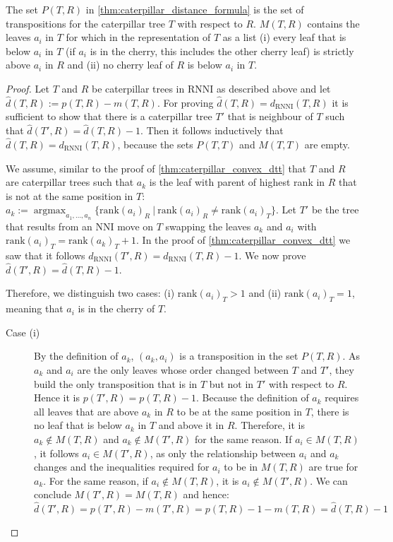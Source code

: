 \documentclass[11pt]{amsart}
\newcommand{\rnni}{\mathrm{RNNI}}
\newcommand{\rank}{\mathrm{rank}}
\newcommand{\nni}{\mathrm{NNI}}
\DeclareMathOperator*{\argmax}{argmax}
\begin{document}
The set $P(T,R)$ in \autoref{thm:caterpillar_distance_formula} is the set of transpositions for the caterpillar tree $T$ with respect to $R$.
$M(T,R)$ contains the leaves $a_i$ in $T$ for which in the representation of $T$ as a list (i) every leaf that is below $a_i$ in $T$ (if $a_i$ is in the cherry, this includes the other cherry leaf) is strictly above $a_i$ in $R$ and (ii) no cherry leaf of $R$ is below $a_i$ in $T$.

\begin{proof}
	Let $T$ and $R$ be caterpillar trees in $\rnni$ as described above and let $\widehat d(T,R) := p(T,R) - m(T,R)$.
	For proving $\widehat d(T,R) = d_{\rnni}(T,R)$ it is sufficient to show that there is a caterpillar tree $T'$ that is neighbour of $T$ such that $\widehat d(T',R) = \widehat d(T,R) - 1$.
	Then it follows inductively that $\widehat d(T,R) = d_{\rnni}(T,R)$, because the sets $P(T,T)$ and $M(T,T)$ are empty.

	We assume, similar to the proof of \autoref{thm:caterpillar_convex_dtt} that $T$ and $R$ are caterpillar trees such that $a_k$ is the leaf with parent of highest rank in $R$ that is not at the same position in $T$:
	$a_k := \argmax_{a_1, \ldots, a_n}\{\rank(a_i)_{R} \ |\  \rank(a_i)_{R} \neq \rank(a_i)_{T}\}$.
	Let $T'$ be the tree that results from an $\nni$ move on $T$ swapping the leaves $a_k$ and $a_i$ with $\rank(a_i)_T = \rank(a_k)_T + 1$.
	In the proof of \autoref{thm:caterpillar_convex_dtt} we saw that it follows $d_{\rnni}(T',R) = d_{\rnni}(T,R) - 1$.	
	We now prove $\widehat d(T',R) = \widehat d(T,R) - 1$.

	Therefore, we distinguish two cases: (i) $\rank(a_i)_T>1$ and (ii) $\rank(a_i)_T = 1$, meaning that $a_i$ is in the cherry of $T$.

	\begin{description}
		\item[Case (i)]
			By the definition of $a_k$, $(a_k,a_i)$ is a transposition in the set $P(T,R)$.
			As $a_k$ and $a_i$ are the only leaves whose order changed between $T$ and $T'$, they build the only transposition that is in $T$ but not in $T'$ with respect to $R$.
			Hence it is $p(T',R) = p(T,R) - 1$.
			Because the definition of $a_k$ requires all leaves that are above $a_k$ in $R$ to be at the same position in $T$, there is no leaf that is below $a_k$ in $T$ and above it in $R$.
			Therefore, it is $a_k \notin M(T,R)$ and $a_k \notin M(T',R)$ for the same reason.
			If $a_i \in M(T,R)$, it follows $a_i \in M(T',R)$, as only the relationship between $a_i$ and $a_k$ changes and the inequalities required for $a_i$ to be in $M(T,R)$ are true for $a_k$.
			For the same reason, if $a_i \notin M(T,R)$, it is $a_i \notin M(T',R)$.
			We can conclude $M(T',R) = M(T,R)$ and hence:
			\[\widehat d(T',R) = p(T',R) - m(T',R) = p(T,R) - 1 - m(T,R) = \widehat d(T,R) - 1\]


\end{description}
\end{proof}
\end{document}
